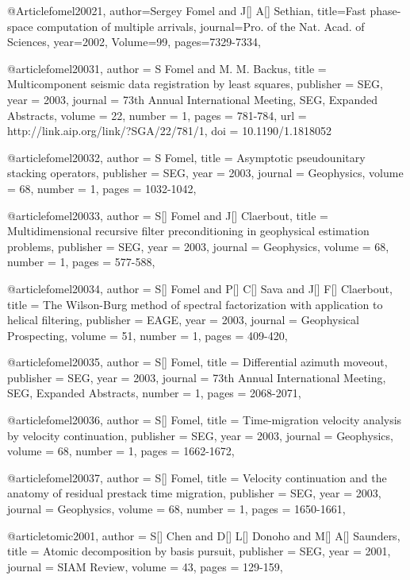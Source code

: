 @Article{fomel20021,
  author={Sergey Fomel and J[] A[] Sethian},
  title={Fast phase-space computation of multiple arrivals},
  journal={Pro. of the Nat. Acad. of Sciences},
  year=2002,
  Volume=99,
  pages={7329-7334},
}



@article{fomel20031,
  author =	 {S Fomel and M. M. Backus},
  title =	 {Multicomponent seismic data registration by least
                  squares},
  publisher =	 {SEG},
  year =	 2003,
  journal =	 {73th Annual International Meeting, SEG, Expanded Abstracts},
  volume =	 22,
  number =	 1,
  pages =	 {781-784},
  url =		 {http://link.aip.org/link/?SGA/22/781/1},
  doi =		 {10.1190/1.1818052}
}

@article{fomel20032,
  author =	 {S Fomel},
  title =	 {Asymptotic pseudounitary stacking operators},
  publisher =	 {SEG},
  year =	 2003,
  journal =	 {Geophysics},
  volume =	 68,
  number =	 1,
  pages =	 {1032-1042},
}

@article{fomel20033,
  author =	 {S[] Fomel and J[] Claerbout},
  title =	 {Multidimensional recursive filter preconditioning in geophysical estimation problems},
  publisher =	 {SEG},
  year =	 2003,
  journal =	 {Geophysics},
  volume =	 68,
  number =	 1,
  pages =	 {577-588},
}

@article{fomel20034,
  author =	 {S[] Fomel and P[] C[] Sava and J[] F[] Claerbout},
  title =	 {The Wilson-Burg method of spectral factorization with application to helical filtering},
  publisher =	 {EAGE},
  year =	 2003,
  journal =	 {Geophysical Prospecting},
  volume =	 51,
  number =	 1,
  pages =	 {409-420},
}

@article{fomel20035,
  author =	 {S[] Fomel},
  title =	 {Differential azimuth moveout},
  publisher =	 {SEG},
  year =	 2003,
  journal =	 {73th Annual International Meeting, SEG, Expanded Abstracts},
  number =	 1,
  pages =	 {2068-2071},
}

@article{fomel20036,
  author =	 {S[] Fomel},
  title =	 {Time-migration velocity analysis by velocity continuation},
  publisher =	 {SEG},
  year =	 2003,
  journal =	 {Geophysics},
  volume =	 68,
  number =	 1,
  pages =	 {1662-1672},
}

@article{fomel20037,
  author =	 {S[] Fomel},
  title =	 {Velocity continuation and the anatomy of residual prestack time migration},
  publisher =	 {SEG},
  year =	 2003,
  journal =	 {Geophysics},
  volume =	 68,
  number =	 1,
  pages =	 {1650-1661},
}

@article{tomic2001,
  author =	 {S[] Chen and D[] L[] Donoho and M[] A[] Saunders},
  title =	 {Atomic decomposition by basis pursuit},
  publisher =	 {SEG},
  year =	 2001,
  journal =	 {SIAM Review},
  volume =	 43,
  pages =	 {129-159},
}


